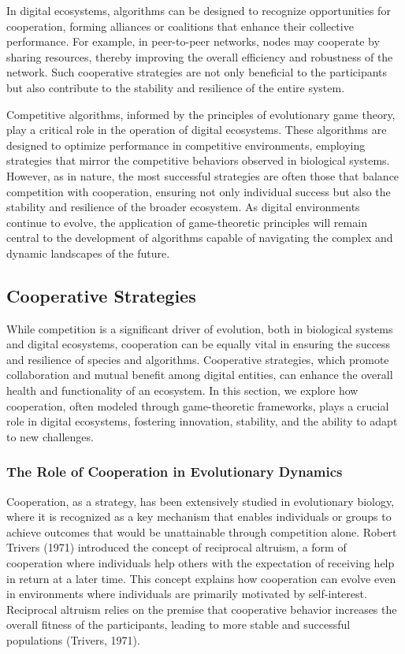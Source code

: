 \documentclass[12pt,twoside]{article}
\begin{document}
In digital ecosystems, algorithms can be designed to recognize opportunities for cooperation, forming alliances or coalitions that enhance their collective performance. For example, in peer-to-peer networks, nodes may cooperate by sharing resources, thereby improving the overall efficiency and robustness of the network. Such cooperative strategies are not only beneficial to the participants but also contribute to the stability and resilience of the entire system.

Competitive algorithms, informed by the principles of evolutionary game theory, play a critical role in the operation of digital ecosystems. These algorithms are designed to optimize performance in competitive environments, employing strategies that mirror the competitive behaviors observed in biological systems. However, as in nature, the most successful strategies are often those that balance competition with cooperation, ensuring not only individual success but also the stability and resilience of the broader ecosystem. As digital environments continue to evolve, the application of game-theoretic principles will remain central to the development of algorithms capable of navigating the complex and dynamic landscapes of the future.

\subsection{Cooperative Strategies}

While competition is a significant driver of evolution, both in biological systems and digital ecosystems, cooperation can be equally vital in ensuring the success and resilience of species and algorithms. Cooperative strategies, which promote collaboration and mutual benefit among digital entities, can enhance the overall health and functionality of an ecosystem. In this section, we explore how cooperation, often modeled through game-theoretic frameworks, plays a crucial role in digital ecosystems, fostering innovation, stability, and the ability to adapt to new challenges.

\subsubsection{The Role of Cooperation in Evolutionary Dynamics}

Cooperation, as a strategy, has been extensively studied in evolutionary biology, where it is recognized as a key mechanism that enables individuals or groups to achieve outcomes that would be unattainable through competition alone. Robert Trivers (1971) introduced the concept of reciprocal altruism, a form of cooperation where individuals help others with the expectation of receiving help in return at a later time. This concept explains how cooperation can evolve even in environments where individuals are primarily motivated by self-interest. Reciprocal altruism relies on the premise that cooperative behavior increases the overall fitness of the participants, leading to more stable and successful populations (Trivers, 1971).
\end{document}
